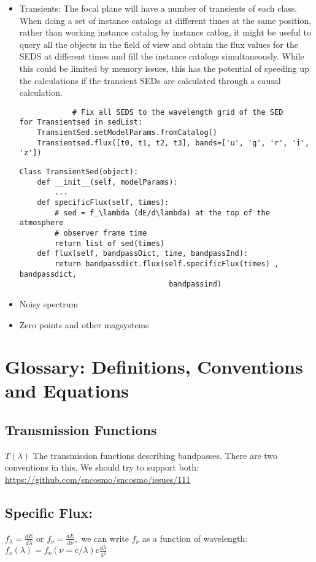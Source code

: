 \documentclass{article}[12pt]
\begin{document}
\begin{itemize}
\begin{verbatim}
                                                             ['u', 'g', 'r', 'i', 'z']])
    \end{verbatim}
    \item Transients: The focal plane will have a number of transients of each class. When doing a set of instance catalogs at different times at the same position, rather than working instance catalog by instance catlog, it might be useful to query all the objects in the field of view and obtain the flux values for the SEDS at different times and fill the instance catalogs simultaneously. While this could be limited by memory issues, this has the potential of speeding up the calculations if the transient SEDs are calculated through a causal calculation.
        \begin{verbatim}
            # Fix all SEDS to the wavelength grid of the SED
for Transientsed in sedList:
    TransientSed.setModelParams.fromCatalog()
    Transientsed.flux([t0, t1, t2, t3], bands=['u', 'g', 'r', 'i', 'z'])
        \end{verbatim}
        \begin{verbatim}
Class TransientSed(object):
    def __init__(self, modelParams):
        ...
    def specificFlux(self, times):
        # sed = f_\lambda (dE/d\lambda) at the top of the atmosphere
        # observer frame time
        return list of sed(times)
    def flux(self, bandpassDict, time, bandpassInd):
        return bandpassdict.flux(self.specificFlux(times) , bandpassdict,
                                  bandpassind)
        \end{verbatim}

    \item Noisy spectrum 
    \item Zero points and other magsystems 
\end{itemize}

\section{Glossary: Definitions, Conventions and Equations}

\subsection{Transmission Functions} $T(\lambda)$ The transmission functions describing bandpasses. There are two conventions in this. We should try to support both: \url{https://github.com/sncosmo/sncosmo/issues/111} 

\subsection{Specific Flux:} $f_{\lambda} = \frac{dE}{d\lambda}$ or 
$f_{\nu} = \frac{dE}{d\nu},$ we can write $f_\nu$ as a function of wavelength:
$f_\nu(\lambda) = f_{\nu}(\nu=c/\lambda) c \frac{d\lambda}{\lambda^2}$
\end{document}
